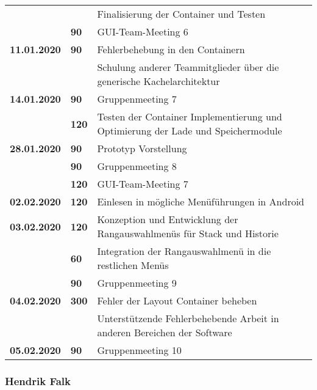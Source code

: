{\begin{longtable}{|l|l|p{11cm}|}
			& & Finalisierung der Container und Testen \\\cline{2-3}	
			& \textbf{\hfill 90} & GUI-Team-Meeting 6
		\\	
		\hline \textbf{11.01.2020}
			& \textbf{\hfill 90} & Fehlerbehebung in den Containern \\
			& & Schulung anderer Teammitglieder über die generische Kachelarchitektur
		\\	
		\hline \textbf{14.01.2020}
			& \textbf{\hfill 90} & Gruppenmeeting 7 \\\cline{2-3}
			& \textbf{\hfill 120} & Testen der Container Implementierung und Optimierung der Lade und Speichermodule 
		\\	
		\hline \textbf{28.01.2020}
			& \textbf{\hfill 90} & Prototyp Vorstellung \\\cline{2-3}
			& \textbf{\hfill 90} & Gruppenmeeting 8 \\
			& \textbf{\hfill 120} & GUI-Team-Meeting 7
		\\	
		\hline \textbf{02.02.2020}
			& \textbf{\hfill 120} & Einlesen in mögliche Menüführungen in Android
		\\	
		\hline \textbf{03.02.2020}
			& \textbf{\hfill 120} & Konzeption und Entwicklung der Rangauswahlmenüs für Stack und Historie \\\cline{2-3}
			& \textbf{\hfill 60} & Integration der Rangauswahlmenü in die restlichen Menüs \\
			& \textbf{\hfill 90} & Gruppenmeeting 9
		\\	
		\hline \textbf{04.02.2020}
			& \textbf{\hfill 300} & Fehler der Layout Container beheben \\
			& & Unterstützende Fehlerbehebende Arbeit in anderen Bereichen der Software
		\\	
		\hline \textbf{05.02.2020}
			& \textbf{\hfill 90} & Gruppenmeeting 10
		\\ \hline\hline
	\end{longtable}
}

\clearpage

\subsubsection{Hendrik Falk}

